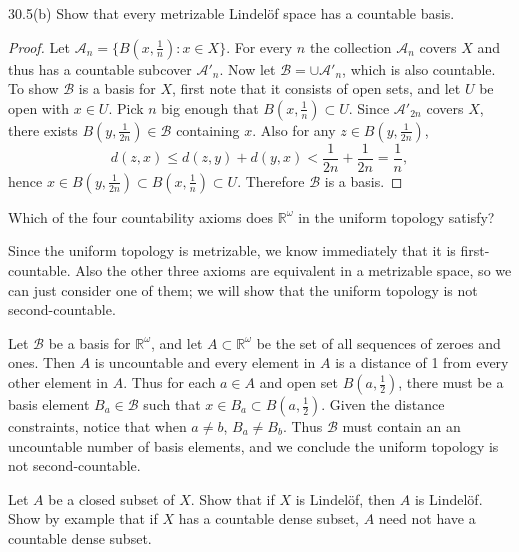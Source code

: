 \documentclass[11pt]{article}
\begin{document}
\begin{ex}{30.5(b)}
  Show that every metrizable Lindel{\"o}f space has a countable basis.
\end{ex}

\begin{proof}
  Let $\mathcal{A}_n = \{B(x, \frac{1}{n}) : x \in X\}$. For every $n$ the
  collection $\mathcal{A}_n$ covers $X$ and thus has a countable subcover
  $\mathcal{A}'_n$. Now let $\mathcal{B} = \cup \mathcal{A}'_n$, which is also
  countable. To show $\mathcal{B}$ is a basis for $X$, first note that it
  consists of open sets, and let $U$ be open with $x \in U$. Pick $n$ big enough
  that $B(x, \frac{1}{n}) \subset U$. Since $\mathcal{A}'_{2n}$ covers $X$, there
  exists $B(y, \frac{1}{2n}) \in \mathcal{B}$ containing $x$. Also for any $z
  \in B(y, \frac{1}{2n})$,
  \[ d(z, x) \leq d(z, y) + d(y, x) < \frac{1}{2n} + \frac{1}{2n} = \frac{1}{n},
  \]
  hence $x \in B(y, \frac{1}{2n}) \subset B(x, \frac{1}{n}) \subset U$.
  Therefore $\mathcal{B}$ is a basis.
\end{proof}

\begin{ex}{30.8}
  Which of the four countability axioms does $\mathbb{R}^\omega$ in the uniform
  topology satisfy?
\end{ex}

\begin{solution}
  Since the uniform topology is metrizable, we know immediately that it
  is first-countable. Also the other three axioms are equivalent in a metrizable
  space, so we can just consider one of them; we will show that the uniform
  topology is not second-countable.

  Let $\mathcal{B}$ be a basis for $\mathbb{R}^\omega$, and let
  $A \subset \mathbb{R}^\omega$ be the set of all sequences of zeroes and ones.
  Then $A$ is uncountable and every element in $A$ is a distance of 1 from every
  other element in $A$. Thus for each $a \in A$ and open set $B(a,
  \frac{1}{2})$, there must be a basis element $B_a \in \mathcal{B}$ such that
  $x \in B_a \subset B(a, \frac{1}{2})$. Given the distance constraints, notice
  that when $a \neq b$, $B_a \neq B_b$. Thus $\mathcal{B}$ must contain an
  an uncountable number of basis elements, and we conclude the uniform topology
  is not second-countable.
\end{solution}

\begin{ex}{30.9}
  Let $A$ be a closed subset of $X$. Show that if $X$ is Lindel{\"o}f, then $A$
  is Lindel{\"o}f. Show by example that if $X$ has a countable dense subset, $A$
  need not have a countable dense subset.
\end{ex}
\end{document}
